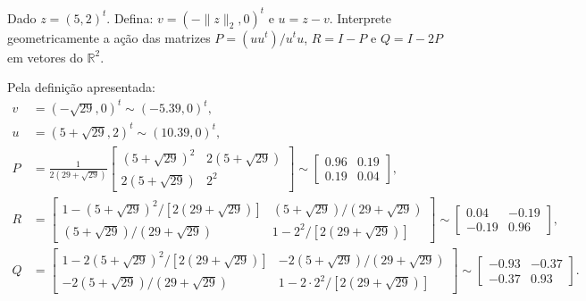 \begin{questions}
    \question Dado $z = (5, 2)^t$. Defina: $v = \left( -\| z \|_2, 0 \right)^t$ e $u = z - v$. Interprete geometricamente a a\c{c}\~{a}o das matrizes $P = \left( u u^t \right) / u^t u$, $R = I - P$ e $Q = I - 2P$ em vetores do $\mathbb{R}^2$.
    \begin{solution}
        Pela defini\c{c}\~{a}o apresentada:
        \begin{align*}
            v &= \left( -\sqrt{29}, 0 \right)^t \sim \left( -5.39, 0 \right)^t, \\
            u &= \left( 5 + \sqrt{29}, 2 \right)^t \sim \left( 10.39, 0 \right)^t, \\
            P &= \frac{1}{2 \left( 29 + \sqrt{29} \right)} \begin{bmatrix}
                \left( 5 + \sqrt{29} \right)^2 & 2 \left( 5 + \sqrt{29} \right) \\
                2 \left( 5 + \sqrt{29} \right) & 2^2
            \end{bmatrix} \sim \begin{bmatrix}
                0.96 & 0.19 \\
                0.19 & 0.04
            \end{bmatrix}, \\
            R &= \begin{bmatrix}
                1 - \left( 5 + \sqrt{29} \right)^2 / \left[ 2 \left( 29 + \sqrt{29} \right) \right] & \left( 5 + \sqrt{29} \right) / \left( 29 + \sqrt{29} \right) \\
                \left( 5 + \sqrt{29} \right) / \left( 29 + \sqrt{29} \right) & 1 - 2^2 / \left[ 2 \left( 29 + \sqrt{29} \right) \right]
            \end{bmatrix} \sim \begin{bmatrix}
                0.04 & -0.19 \\
                -0.19 & 0.96
            \end{bmatrix}, \\
            Q &= \begin{bmatrix}
                1 - 2 \left( 5 + \sqrt{29} \right)^2 / \left[ 2 \left( 29 + \sqrt{29} \right) \right] & - 2 \left( 5 + \sqrt{29} \right) / \left( 29 + \sqrt{29} \right) \\
                - 2 \left( 5 + \sqrt{29} \right) / \left( 29 + \sqrt{29} \right) & 1 - 2 \cdot 2^2 / \left[ 2 \left( 29 + \sqrt{29} \right) \right]
            \end{bmatrix} \sim \begin{bmatrix}
                -0.93 & -0.37 \\
                -0.37 & 0.93
            \end{bmatrix}.
        \end{align*}


\end{solution}
\end{questions}
